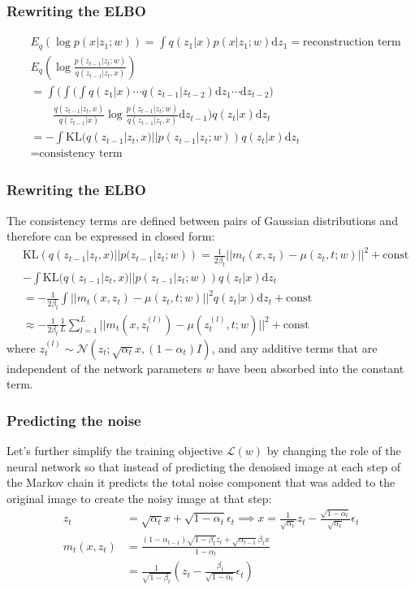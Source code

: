 \documentclass{beamer}
\begin{document}
\begin{frame}
    \frametitle{Rewriting the ELBO}
    \begin{align*}
        &E_{q}(\log{}p(x|z_{1};w))=\int{}q(z_{1}|x)p(x|z_{1};w)\mathrm{d}z_{1}=\textrm{reconstruction term} \\
        &E_{q}(\log\frac{p(z_{t-1}|z_{t};w)}{q(z_{t-1}|z_{t},x)}) \\
        &=\int\bigg(\int\bigg(\int{}q(z_{1}|x)\cdots{}q(z_{t-1}|z_{t-2})\mathrm{d}z_{1}\cdots\mathrm{d}z_{t-2}\bigg) \\
        &\qquad\frac{q(z_{t-1}|z_{t},x)}{q(z_{t-1}|x)}\log\frac{p(z_{t-1}|z_{t};w)}{q(z_{t-1}|z_{t},x)}\mathrm{d}z_{t-1}\bigg)q(z_{t}|x)\mathrm{d}z_{t} \\
        &=-\int\mathrm{KL}(q(z_{t-1}|z_{t},x)||p(z_{t-1}|z_{t};w))q(z_{t}|x)\mathrm{d}z_{t} \\
        &=\textrm{consistency term}
    \end{align*}
\end{frame}

\begin{frame}
    \frametitle{Rewriting the ELBO}
    The consistency terms are defined between pairs of Gaussian distributions and therefore can be expressed in closed form:
    \begin{align*}
        &\mathrm{KL}(q(z_{t-1}|z_{t},x)||p(z_{t-1}|z_{t};w))=\frac{1}{2\beta_{t}}||m_{t}(x,z_{t})-\mu(z_{t},t;w)||^{2}+\textrm{const} \\
        &-\int\mathrm{KL}(q(z_{t-1}|z_{t},x)||p(z_{t-1}|z_{t};w))q(z_{t}|x)\mathrm{d}z_{t} \\
        &=-\frac{1}{2\beta_{t}}\int||m_{t}(x,z_{t})-\mu(z_{t},t;w)||^{2}q(z_{t}|x)\mathrm{d}z_{t}+\textrm{const} \\
        &\approx-\frac{1}{2\beta_{t}}\frac{1}{L}\sum_{l=1}^{L}||m_{t}(x,z_{t}^{(l)})-\mu(z_{t}^{(l)},t;w)||^{2}+\textrm{const}
    \end{align*}
    where $z_{t}^{(l)}\sim\mathcal{N}(z_{t};\sqrt{\alpha_{t}}x,(1-\alpha_{t})I)$, and any additive terms that are independent of the network parameters $w$ have been absorbed into the constant term. 
\end{frame}

\begin{frame}
    \frametitle{Predicting the noise}
    Let's further simplify the training objective $\mathcal{L}(w)$ by changing the role of the neural network so that instead of predicting the denoised image at each step of the Markov chain it predicts the total noise component that was added to the original image to create the noisy image at that step:
    \begin{align*}
        z_{t}&=\sqrt{\alpha_{t}}x+\sqrt{1-\alpha_{t}}\epsilon_{t}\implies{}x=\frac{1}{\sqrt{\alpha_{t}}}z_{t}-\frac{\sqrt{1-\alpha_{t}}}{\sqrt{\alpha_{t}}}\epsilon_{t} \\
        m_{t}(x,z_{t})&=\frac{(1-\alpha_{t-1})\sqrt{1-\beta_{t}}z_{t}+\sqrt{\alpha_{t-1}}\beta_{t}x}{1-\alpha_{t}} \\
        &=\frac{1}{\sqrt{1-\beta_{t}}}(z_{t}-\frac{\beta_{t}}{\sqrt{1-\alpha_{t}}}\epsilon_{t})
    \end{align*}
\end{frame}
\end{document}
